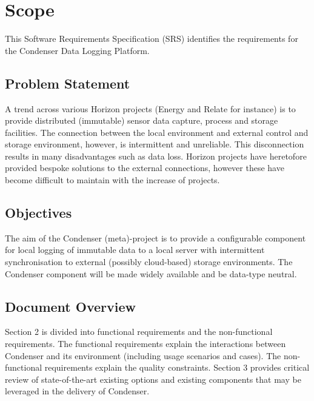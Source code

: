 	\section{Scope}
This Software Requirements Specification (SRS) identifies the requirements for the Condenser Data Logging Platform.
		\subsection{Problem Statement}
A trend across various Horizon projects (Energy and Relate for instance) is to provide distributed (immutable) sensor data capture, process and storage facilities. The connection between the local environment and external control and storage environment, however, is intermittent and unreliable.  This disconnection results in many disadvantages such as data loss. Horizon projects have heretofore provided bespoke solutions to the external connections, however these have become difficult to maintain with the increase of projects.		
		\subsection{Objectives}
The aim of the Condenser (meta)-project is to provide a configurable component for local logging of immutable data to a local server with intermittent synchronisation to external (possibly cloud-based) storage environments. The Condenser component will be made widely available and be data-type neutral.
		\subsection{Document Overview}
Section 2 is divided into functional requirements and the non-functional requirements. The functional requirements explain the interactions between Condenser and its environment (including usage scenarios and cases). The non-functional requirements explain the quality constraints. Section 3 provides critical review of state-of-the-art existing options and existing components that may be leveraged in the delivery of Condenser.